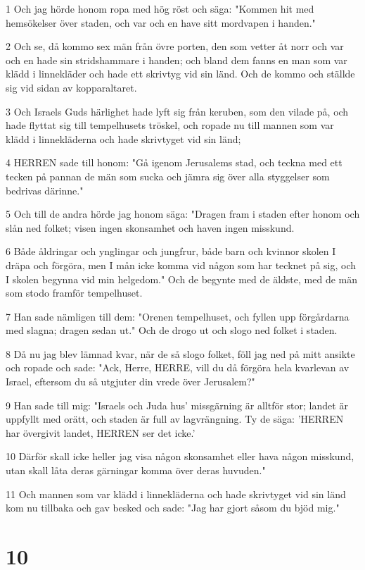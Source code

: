 \par 1 Och jag hörde honom ropa med hög röst och säga: "Kommen hit med hemsökelser över staden, och var och en have sitt mordvapen i handen."
\par 2 Och se, då kommo sex män från övre porten, den som vetter åt norr och var och en hade sin stridshammare i handen; och bland dem fanns en man som var klädd i linnekläder och hade ett skrivtyg vid sin länd. Och de kommo och ställde sig vid sidan av kopparaltaret.
\par 3 Och Israels Guds härlighet hade lyft sig från keruben, som den vilade på, och hade flyttat sig till tempelhusets tröskel, och ropade nu till mannen som var klädd i linnekläderna och hade skrivtyget vid sin länd;
\par 4 HERREN sade till honom: "Gå igenom Jerusalems stad, och teckna med ett tecken på pannan de män som sucka och jämra sig över alla styggelser som bedrivas därinne."
\par 5 Och till de andra hörde jag honom säga: "Dragen fram i staden efter honom och slån ned folket; visen ingen skonsamhet och haven ingen misskund.
\par 6 Både åldringar och ynglingar och jungfrur, både barn och kvinnor skolen I dräpa och förgöra, men I mån icke komma vid någon som har tecknet på sig, och I skolen begynna vid min helgedom." Och de begynte med de äldste, med de män som stodo framför tempelhuset.
\par 7 Han sade nämligen till dem: "Orenen tempelhuset, och fyllen upp förgårdarna med slagna; dragen sedan ut." Och de drogo ut och slogo ned folket i staden.
\par 8 Då nu jag blev lämnad kvar, när de så slogo folket, föll jag ned på mitt ansikte och ropade och sade: "Ack, Herre, HERRE, vill du då förgöra hela kvarlevan av Israel, eftersom du så utgjuter din vrede över Jerusalem?"
\par 9 Han sade till mig: "Israels och Juda hus' missgärning är alltför stor; landet är uppfyllt med orätt, och staden är full av lagvrängning. Ty de säga: 'HERREN har övergivit landet, HERREN ser det icke.'
\par 10 Därför skall icke heller jag visa någon skonsamhet eller hava någon misskund, utan skall låta deras gärningar komma över deras huvuden."
\par 11 Och mannen som var klädd i linnekläderna och hade skrivtyget vid sin länd kom nu tillbaka och gav besked och sade: "Jag har gjort såsom du bjöd mig."

\chapter{10}

